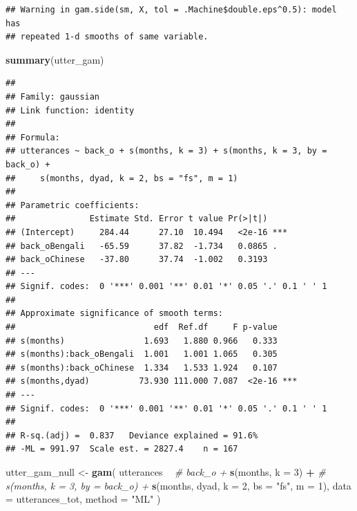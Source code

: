 \documentclass[]{article}
\newenvironment{Shaded}{\begin{snugshade}}{\end{snugshade}}
\newcommand{\CommentTok}[1]{\textcolor[rgb]{0.56,0.35,0.01}{\textit{#1}}}
\newcommand{\DataTypeTok}[1]{\textcolor[rgb]{0.13,0.29,0.53}{#1}}
\newcommand{\DecValTok}[1]{\textcolor[rgb]{0.00,0.00,0.81}{#1}}
\newcommand{\KeywordTok}[1]{\textcolor[rgb]{0.13,0.29,0.53}{\textbf{#1}}}
\newcommand{\NormalTok}[1]{#1}
\newcommand{\OperatorTok}[1]{\textcolor[rgb]{0.81,0.36,0.00}{\textbf{#1}}}
\newcommand{\StringTok}[1]{\textcolor[rgb]{0.31,0.60,0.02}{#1}}
\begin{document}
\begin{verbatim}
## Warning in gam.side(sm, X, tol = .Machine$double.eps^0.5): model has
## repeated 1-d smooths of same variable.
\end{verbatim}

\begin{Shaded}
\begin{Highlighting}[]
\KeywordTok{summary}\NormalTok{(utter_gam)}
\end{Highlighting}
\end{Shaded}

\begin{verbatim}
## 
## Family: gaussian 
## Link function: identity 
## 
## Formula:
## utterances ~ back_o + s(months, k = 3) + s(months, k = 3, by = back_o) + 
##     s(months, dyad, k = 2, bs = "fs", m = 1)
## 
## Parametric coefficients:
##               Estimate Std. Error t value Pr(>|t|)    
## (Intercept)     284.44      27.10  10.494   <2e-16 ***
## back_oBengali   -65.59      37.82  -1.734   0.0865 .  
## back_oChinese   -37.80      37.74  -1.002   0.3193    
## ---
## Signif. codes:  0 '***' 0.001 '**' 0.01 '*' 0.05 '.' 0.1 ' ' 1
## 
## Approximate significance of smooth terms:
##                            edf  Ref.df     F p-value    
## s(months)                1.693   1.880 0.966   0.333    
## s(months):back_oBengali  1.001   1.001 1.065   0.305    
## s(months):back_oChinese  1.334   1.533 1.924   0.107    
## s(months,dyad)          73.930 111.000 7.087  <2e-16 ***
## ---
## Signif. codes:  0 '***' 0.001 '**' 0.01 '*' 0.05 '.' 0.1 ' ' 1
## 
## R-sq.(adj) =  0.837   Deviance explained = 91.6%
## -ML = 991.97  Scale est. = 2827.4    n = 167
\end{verbatim}

\begin{Shaded}
\begin{Highlighting}[]
\NormalTok{utter_gam_null <-}\StringTok{ }\KeywordTok{gam}\NormalTok{(}
\NormalTok{  utterances }\OperatorTok{~}
\StringTok{    }\CommentTok{# back_o +}
\StringTok{    }\KeywordTok{s}\NormalTok{(months, }\DataTypeTok{k =} \DecValTok{3}\NormalTok{) }\OperatorTok{+}
\StringTok{    }\CommentTok{# s(months, k = 3, by = back_o) +}
\StringTok{    }\KeywordTok{s}\NormalTok{(months, dyad, }\DataTypeTok{k =} \DecValTok{2}\NormalTok{, }\DataTypeTok{bs =} \StringTok{"fs"}\NormalTok{, }\DataTypeTok{m =} \DecValTok{1}\NormalTok{),}
  \DataTypeTok{data =}\NormalTok{ utterances_tot,}
  \DataTypeTok{method =} \StringTok{"ML"}
\NormalTok{)}
\end{Highlighting}
\end{Shaded}
\end{document}
